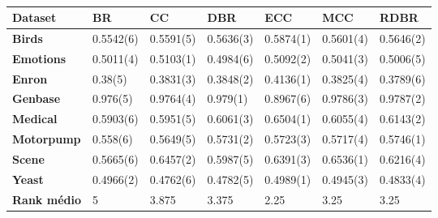 \begin{table}[h]
\begin{tabular}{lllllll}
\hline
\textbf{Dataset} & \textbf{BR} & \textbf{CC} & \textbf{DBR} & \textbf{ECC} & \textbf{MCC} & \textbf{RDBR} \\ \hline
\textbf{Birds}                  & 0.5542(6)   & 0.5591(5)   & 0.5636(3)    & 0.5874(1)    & 0.5601(4)    & 0.5646(2)     \\
\textbf{Emotions}               & 0.5011(4)   & 0.5103(1)   & 0.4984(6)    & 0.5092(2)    & 0.5041(3)    & 0.5006(5)     \\
\textbf{Enron}                  & 0.38(5)     & 0.3831(3)   & 0.3848(2)    & 0.4136(1)    & 0.3825(4)    & 0.3789(6)     \\
\textbf{Genbase}                & 0.976(5)    & 0.9764(4)   & 0.979(1)     & 0.8967(6)    & 0.9786(3)    & 0.9787(2)     \\
\textbf{Medical}                & 0.5903(6)   & 0.5951(5)   & 0.6061(3)    & 0.6504(1)    & 0.6055(4)    & 0.6143(2)     \\
\textbf{Motorpump}              & 0.558(6)    & 0.5649(5)   & 0.5731(2)    & 0.5723(3)    & 0.5717(4)    & 0.5746(1)     \\
\textbf{Scene}                  & 0.5665(6)   & 0.6457(2)   & 0.5987(5)    & 0.6391(3)    & 0.6536(1)    & 0.6216(4)     \\
\textbf{Yeast}                  & 0.4966(2)   & 0.4762(6)   & 0.4782(5)    & 0.4989(1)    & 0.4945(3)    & 0.4833(4)     \\ \hline
\textbf{Rank médio}             & 5           & 3.875       & 3.375        & 2.25         & 3.25         & 3.25          \\ \hline
\end{tabular}
\caption{}
\label{tab:EBAlogi}
\end{table}